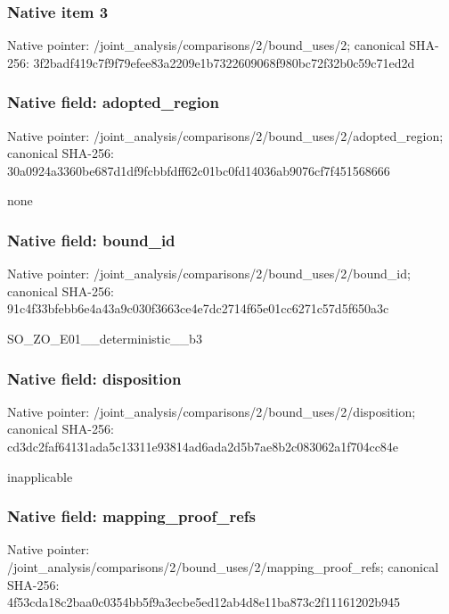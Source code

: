 \documentclass[10pt,a4paper]{article}
\begin{document}
\subsubsection{Native item 3}
Native pointer: /joint\_\allowbreak{}analysis/comparisons/2/bound\_\allowbreak{}uses/2; canonical SHA-256: 3f2badf419c7f9f79efee83a2209e1b7322609068f980bc72f32b0c59c71ed2d

\subsubsection{Native field: adopted\_\allowbreak{}region}
Native pointer: /joint\_\allowbreak{}analysis/comparisons/2/bound\_\allowbreak{}uses/2/adopted\_\allowbreak{}region; canonical SHA-256: 30a0924a3360be687d1df9fcbbfdff62c01bc0fd14036ab9076cf7f451568666

\begingroup\raggedright\sloppy none\par\endgroup

\subsubsection{Native field: bound\_\allowbreak{}id}
Native pointer: /joint\_\allowbreak{}analysis/comparisons/2/bound\_\allowbreak{}uses/2/bound\_\allowbreak{}id; canonical SHA-256: 91c4f33bfebb6e4a43a9c030f3663ce4e7dc2714f65e01cc6271c57d5f650a3c

\begingroup\raggedright\sloppy SO\_\allowbreak{}ZO\_\allowbreak{}E01\_\allowbreak{}\_\allowbreak{}deterministic\_\allowbreak{}\_\allowbreak{}b3\par\endgroup

\subsubsection{Native field: disposition}
Native pointer: /joint\_\allowbreak{}analysis/comparisons/2/bound\_\allowbreak{}uses/2/disposition; canonical SHA-256: cd3dc2faf64131ada5c13311e93814ad6ada2d5b7ae8b2c083062a1f704cc84e

\begingroup\raggedright\sloppy inapplicable\par\endgroup

\subsubsection{Native field: mapping\_\allowbreak{}proof\_\allowbreak{}refs}
Native pointer: /joint\_\allowbreak{}analysis/comparisons/2/bound\_\allowbreak{}uses/2/mapping\_\allowbreak{}proof\_\allowbreak{}refs; canonical SHA-256: 4f53cda18c2baa0c0354bb5f9a3ecbe5ed12ab4d8e11ba873c2f11161202b945
\end{document}
